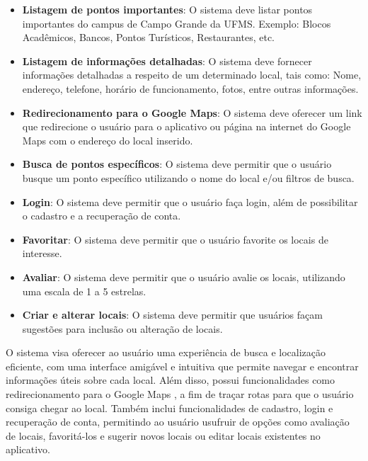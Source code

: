     \begin{itemize}
      \item \textbf{Listagem de pontos importantes}: O sistema deve listar pontos importantes do campus de Campo Grande da UFMS. Exemplo: Blocos Acadêmicos, Bancos, Pontos Turísticos, Restaurantes, etc.
      \item \textbf{Listagem de informações detalhadas}: O sistema deve fornecer informações detalhadas a respeito de um determinado local, tais como: Nome, endereço, telefone, horário de funcionamento, fotos, entre outras informações.
      \item \textbf{Redirecionamento para o Google Maps}:  O sistema deve oferecer um link que redirecione o usuário para o aplicativo ou página na internet do Google Maps \cite{maps2005} com o endereço do local inserido.
      \item \textbf{Busca de pontos específicos}: O sistema deve permitir que o usuário busque um ponto específico utilizando o nome do local e/ou filtros de busca.
      \item \textbf{Login}: O sistema deve permitir que o usuário faça login, além de possibilitar o cadastro e a recuperação de conta.
      \item \textbf{Favoritar}:  O sistema deve permitir que o usuário favorite os locais de interesse.
      \item \textbf{Avaliar}:  O sistema deve permitir que o usuário avalie os locais, utilizando uma escala de 1 a 5 estrelas.
      \item \textbf{Criar e alterar locais}: O sistema deve permitir que usuários façam sugestões para inclusão ou alteração de locais.
    \end{itemize}
    
    O sistema visa oferecer ao usuário uma experiência de busca e localização eficiente, com uma interface amigável e intuitiva que permite navegar e encontrar informações úteis sobre cada local. Além disso, possui funcionalidades como redirecionamento para o Google Maps \cite{maps2005}, a fim de traçar rotas para que o usuário consiga chegar ao local. Também inclui funcionalidades de cadastro, login e recuperação de conta, permitindo ao usuário usufruir de opções como avaliação de locais, favoritá-los e sugerir novos locais ou editar locais existentes no aplicativo.

